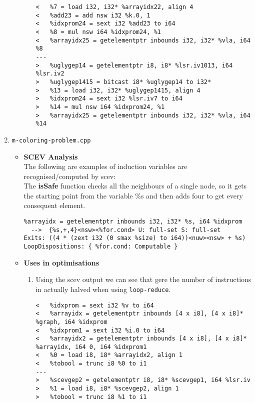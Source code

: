 \documentclass[12pt]{article}
\begin{document}
\begin{enumerate}
\begin{itemize}
\begin{enumerate}
\begin{lstlisting}
<   %7 = load i32, i32* %arrayidx22, align 4
<   %add23 = add nsw i32 %k.0, 1
<   %idxprom24 = sext i32 %add23 to i64
<   %8 = mul nsw i64 %idxprom24, %1
<   %arrayidx25 = getelementptr inbounds i32, i32* %vla, i64 %8
---
>   %uglygep14 = getelementptr i8, i8* %lsr.iv1013, i64 %lsr.iv2
>   %uglygep1415 = bitcast i8* %uglygep14 to i32*
>   %13 = load i32, i32* %uglygep1415, align 4
>   %idxprom24 = sext i32 %lsr.iv7 to i64
>   %14 = mul nsw i64 %idxprom24, %1
>   %arrayidx25 = getelementptr inbounds i32, i32* %vla, i64 %14
\end{lstlisting}
\end{enumerate}
\end{itemize}
\item \texttt{m-coloring-problem.cpp}
\begin{itemize}
\item \textbf{SCEV Analysis}\\
The following are examples of induction variables are recognised/computed by scev:\\
The \textbf{isSafe} function checks all the neighbours of a single node, so it gets the starting point from the variable \%s and then adds four to get every consequent element.
\begin{lstlisting}
%arrayidx = getelementptr inbounds i32, i32* %s, i64 %idxprom
  -->  {%s,+,4}<nsw><%for.cond> U: full-set S: full-set		Exits: ((4 * (zext i32 (0 smax %size) to i64))<nuw><nsw> + %s)		LoopDispositions: { %for.cond: Computable }

\end{lstlisting}
\item \textbf{Uses in optimisations}
\begin{enumerate}
\item Using the scev output we can see that gere the number of instructions in actually halved when using \texttt{loop-reduce}.
\begin{lstlisting}
<   %idxprom = sext i32 %v to i64
<   %arrayidx = getelementptr inbounds [4 x i8], [4 x i8]* %graph, i64 %idxprom
<   %idxprom1 = sext i32 %i.0 to i64
<   %arrayidx2 = getelementptr inbounds [4 x i8], [4 x i8]* %arrayidx, i64 0, i64 %idxprom1
<   %0 = load i8, i8* %arrayidx2, align 1
<   %tobool = trunc i8 %0 to i1
---
>   %scevgep2 = getelementptr i8, i8* %scevgep1, i64 %lsr.iv
>   %1 = load i8, i8* %scevgep2, align 1
>   %tobool = trunc i8 %1 to i1


\end{lstlisting}
\end{enumerate}
\end{itemize}
\end{enumerate}
\end{document}
